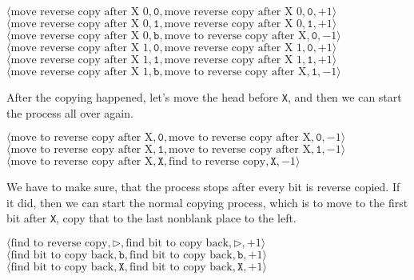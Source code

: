 \documentclass[a4paper,12pt]{article}
\newcommand{\la}{\langle}
\newcommand{\ra}{\rangle}
\begin{document}
    \begin{center}
        $\la \textrm{move reverse copy after X 0}, \texttt{0}, \textrm{move reverse copy after X 0}, \texttt{0}, +1 \ra$\\
        $\la \textrm{move reverse copy after X 0}, \texttt{1}, \textrm{move reverse copy after X 0}, \texttt{1}, +1 \ra$\\
        $\la \textrm{move reverse copy after X 0}, \texttt{b}, \textrm{move to reverse copy after X}, \texttt{0}, -1 \ra$\\
        $\la \textrm{move reverse copy after X 1}, \texttt{0}, \textrm{move reverse copy after X 1}, \texttt{0}, +1 \ra$\\
        $\la \textrm{move reverse copy after X 1}, \texttt{1}, \textrm{move reverse copy after X 1}, \texttt{1}, +1 \ra$\\
        $\la \textrm{move reverse copy after X 1}, \texttt{b}, \textrm{move to reverse copy after X}, \texttt{1}, -1 \ra$\\
    \end{center}
    After the copying happened, let's move the head before \texttt{X}, and then we can start the process all over again.
    \begin{center}
        $\la \textrm{move to reverse copy after X}, \texttt{0}, \textrm{move to reverse copy after X}, \texttt{0}, -1 \ra$\\
        $\la \textrm{move to reverse copy after X}, \texttt{1}, \textrm{move to reverse copy after X}, \texttt{1}, -1 \ra$\\
        $\la \textrm{move to reverse copy after X}, \texttt{X}, \textrm{find to reverse copy}, \texttt{X}, -1 \ra$\\
    \end{center}
    We have to make sure, that the process stops after every bit is reverse copied. If it did, then we can start the normal copying process, which is to move to the first bit after \texttt{X}, copy that to the last nonblank place to the left.
    \begin{center}
        $\la \textrm{find to reverse copy}, \triangleright, \textrm{find bit to copy back}, \triangleright, +1 \ra$\\
        $\la \textrm{find bit to copy back}, \texttt{b}, \textrm{find bit to copy back}, \texttt{b}, +1 \ra$\\
        $\la \textrm{find bit to copy back}, \texttt{X}, \textrm{find bit to copy back}, \texttt{X}, +1 \ra$\\
    \end{center}
\end{document}
